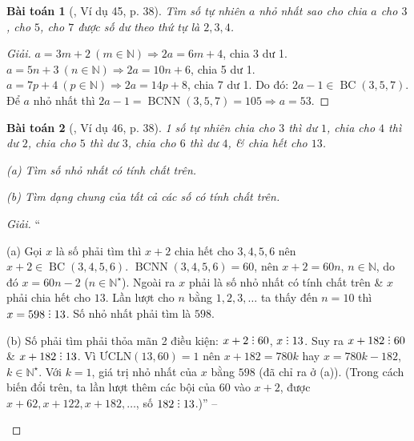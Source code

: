 \documentclass{article}
\numberwithin{equation}{section}
\newtheorem{baitoan}{Bài toán}[section]
\DeclareRobustCommand{\divby}{%
	\mathrel{\vbox{\baselineskip.65ex\lineskiplimit0pt\hbox{.}\hbox{.}\hbox{.}}}%
}
\begin{document}
\begin{baitoan}[\cite{Binh_Toan_6_tap_1}, Ví dụ 45, p. 38]
	Tìm số tự nhiên $a$ nhỏ nhất sao cho chia $a$ cho $3$, cho $5$, cho $7$ được số dư theo thứ tự là $2,3,4$.
\end{baitoan}

\begin{proof}[Giải]
	$a = 3m + 2\ (m\in\mathbb{N})\Rightarrow 2a = 6m + 4$, chia 3 dư 1. $a = 5n + 3\ (n\in\mathbb{N})\Rightarrow 2a = 10n + 6$, chia 5 dư 1. $a = 7p + 4\ (p\in\mathbb{N})\Rightarrow 2a = 14p + 8$, chia 7 dư 1. Do đó: $2a - 1\in\operatorname{BC}(3,5,7)$. Để $a$ nhỏ nhất thì $2a - 1 = \operatorname{BCNN}(3,5,7) = 105\Rightarrow a = 53$.
\end{proof}

\begin{baitoan}[\cite{Binh_Toan_6_tap_1}, Ví dụ 46, p. 38]
	1 số tự nhiên chia cho $3$ thì dư $1$, chia cho $4$ thì dư $2$, chia cho $5$ thì dư $3$, chia cho $6$ thì dư $4$, \& chia hết cho $13$.
	\begin{enumerate*}
		\item[(a)] Tìm số nhỏ nhất có tính chất trên.
		\item[(b)] Tìm dạng chung của tất cả các số có tính chất trên.
	\end{enumerate*}
\end{baitoan}

\begin{proof}[Giải]
	``\begin{enumerate*}
		\item[(a)] Gọi $x$ là số phải tìm thì $x + 2$ chia hết cho $3,4,5,6$ nên $x + 2\in\operatorname{BC}(3,4,5,6)$. $\operatorname{BCNN}(3,4,5,6) = 60$, nên $x + 2 = 60n$, $n\in\mathbb{N}$, do đó $x = 60n - 2$ ($n\in\mathbb{N}^\star$). Ngoài ra $x$ phải là số nhỏ nhất có tính chất trên \& $x$ phải chia hết cho $13$. Lần lượt cho $n$ bằng $1,2,3,\ldots$ ta thấy đến $n = 10$ thì $x = 598\divby 13$. Số nhỏ nhất phải tìm là $598$.
		\item[(b)] Số phải tìm phải thỏa mãn 2 điều kiện: $x + 2\divby 60$, $x\divby 13$. Suy ra $x + 182\divby 60$ \& $x + 182\divby 13$. Vì $\mbox{ƯCLN}(13,60) = 1$ nên $x + 182 = 780k$ hay $x = 780k - 182$, $k\in\mathbb{N}^\star$. Với $k = 1$, giá trị nhỏ nhất của $x$ bằng $598$ (đã chỉ ra ở (a)). (Trong cách biến đổi trên, ta lần lượt thêm các bội của $60$ vào $x + 2$, được $x + 62,x + 122,x + 182,\ldots$, số $182\divby 13$.)'' -- \cite[p. 38]{Binh_Toan_6_tap_1}
	\end{enumerate*}
\end{proof}
\end{document}
